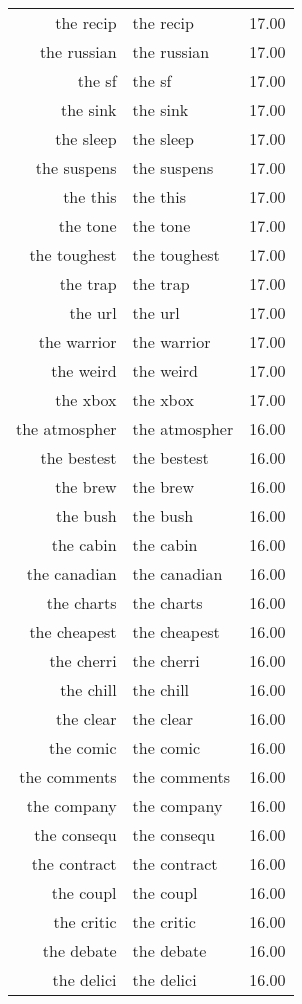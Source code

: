 \begin{table}[ht]
\begin{tabular}{rlr}
  the recip & the recip & 17.00 \\ 
  the russian & the russian & 17.00 \\ 
  the sf & the sf & 17.00 \\ 
  the sink & the sink & 17.00 \\ 
  the sleep & the sleep & 17.00 \\ 
  the suspens & the suspens & 17.00 \\ 
  the this & the this & 17.00 \\ 
  the tone & the tone & 17.00 \\ 
  the toughest & the toughest & 17.00 \\ 
  the trap & the trap & 17.00 \\ 
  the url & the url & 17.00 \\ 
  the warrior & the warrior & 17.00 \\ 
  the weird & the weird & 17.00 \\ 
  the xbox & the xbox & 17.00 \\ 
  the atmospher & the atmospher & 16.00 \\ 
  the bestest & the bestest & 16.00 \\ 
  the brew & the brew & 16.00 \\ 
  the bush & the bush & 16.00 \\ 
  the cabin & the cabin & 16.00 \\ 
  the canadian & the canadian & 16.00 \\ 
  the charts & the charts & 16.00 \\ 
  the cheapest & the cheapest & 16.00 \\ 
  the cherri & the cherri & 16.00 \\ 
  the chill & the chill & 16.00 \\ 
  the clear & the clear & 16.00 \\ 
  the comic & the comic & 16.00 \\ 
  the comments & the comments & 16.00 \\ 
  the company & the company & 16.00 \\ 
  the consequ & the consequ & 16.00 \\ 
  the contract & the contract & 16.00 \\ 
  the coupl & the coupl & 16.00 \\ 
  the critic & the critic & 16.00 \\ 
  the debate & the debate & 16.00 \\ 
  the delici & the delici & 16.00 \\ 

\end{tabular}
\end{table}
